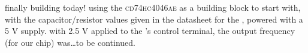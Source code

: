 finally building today! using the \textsc{cd74hc4046ae} as a \pll building
block to start with, with the capacitor/resistor values given in the datasheet
for the \vco, powered with a 5 V supply. with 2.5 V applied to the \vco's
control terminal, the output frequency (for our chip) was\ldots to be
continued.
